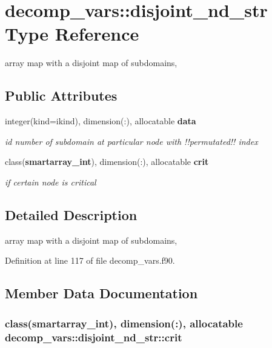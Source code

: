 \section{decomp\+\_\+vars\+:\+:disjoint\+\_\+nd\+\_\+str Type Reference}
\label{structdecomp__vars_1_1disjoint__nd__str}


array map with a disjoint map of subdomains,  


\subsection*{Public Attributes}
\begin{DoxyCompactItemize}
\item 
integer(kind=ikind), dimension(\+:), allocatable {\bf data}
\begin{DoxyCompactList}\small\item\em id number of subdomain at particular node with !!permutated!! index \end{DoxyCompactList}\item 
class({\bf smartarray\+\_\+int}), dimension(\+:), allocatable {\bf crit}
\begin{DoxyCompactList}\small\item\em if certain node is critical \end{DoxyCompactList}\end{DoxyCompactItemize}


\subsection{Detailed Description}
array map with a disjoint map of subdomains, 

Definition at line 117 of file decomp\+\_\+vars.\+f90.



\subsection{Member Data Documentation}
\subsubsection[{crit}]{\setlength{\rightskip}{0pt plus 5cm}class({\bf smartarray\+\_\+int}), dimension(\+:), allocatable decomp\+\_\+vars\+::disjoint\+\_\+nd\+\_\+str\+::crit}\label{structdecomp__vars_1_1disjoint__nd__str_a7347285ea91ea6beb731479d45c71168}


